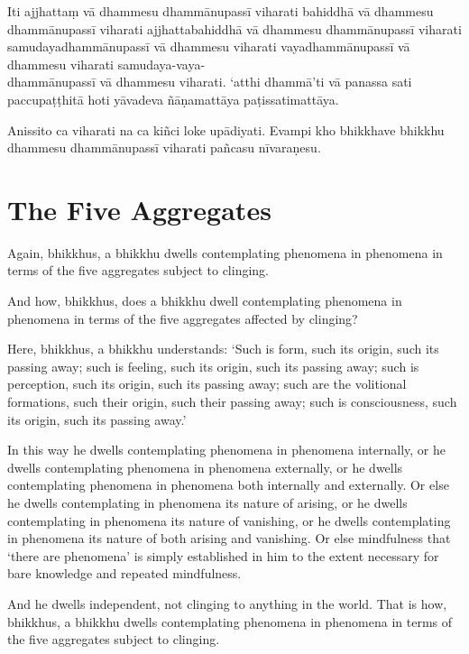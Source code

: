 
Iti ajjhattaṃ vā dhammesu dhammānupassī viharati bahiddhā vā dhammesu
dhammānupassī viharati ajjhattabahiddhā vā dhammesu dhammānupassī viharati
samudayadhammānupassī vā dhammesu viharati vayadhammānupassī vā dhammesu
viharati samudaya-vaya-\\
dhammānupassī vā dhammesu viharati. `atthi dhammā'ti vā
panassa sati paccupaṭṭhitā hoti yāvadeva ñāṇamattāya paṭissatimattāya.

Anissito ca viharati na ca kiñci loke upādiyati. Evampi kho bhikkhave bhikkhu
dhammesu dhammānupassī viharati pañcasu nīvaraṇesu.


\englishPage
\section{The Five Aggregates}

Again, bhikkhus, a bhikkhu dwells contemplating phenomena in phenomena in terms
of the five aggregates subject to clinging.

And how, bhikkhus, does a bhikkhu dwell contemplating phenomena in phenomena in
terms of the five aggregates affected by clinging?

Here, bhikkhus, a bhikkhu understands:
`Such is form, such its origin, such its passing away;
such is feeling, such its origin, such its passing away;
such is perception, such its origin, such its passing away;
such are the volitional formations, such their origin, such their passing away;
such is consciousness, such its origin, such its passing away.'

In this way he dwells contemplating phenomena in phenomena internally, or he
dwells contemplating phenomena in phenomena externally, or he dwells
contemplating phenomena in phenomena both internally and externally. Or else he
dwells contemplating in phenomena its nature of arising, or he dwells
contemplating in phenomena its nature of vanishing, or he dwells contemplating
in phenomena its nature of both arising and vanishing. Or else mindfulness that
‘there are phenomena’ is simply established in him to the extent necessary for
bare knowledge and repeated mindfulness.

And he dwells independent, not clinging to anything in the world. That is how,
bhikkhus, a bhikkhu dwells contemplating phenomena in phenomena in terms of the
five aggregates subject to clinging.

